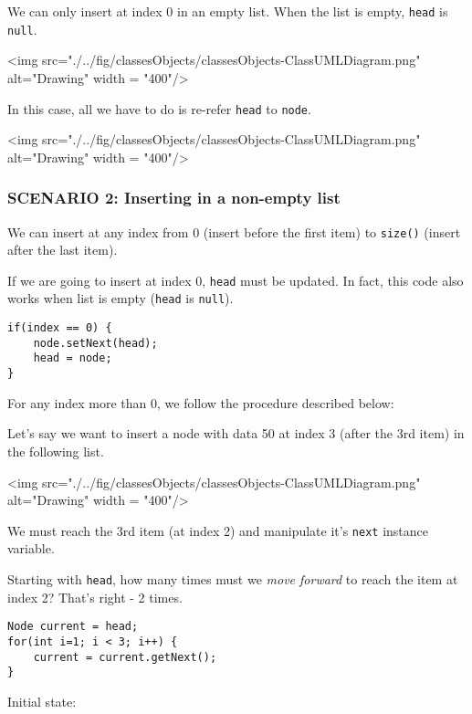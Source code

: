 We can only insert at index 0 in an empty list. When the list is empty, \texttt{head} is \texttt{null}.

\vskip 0.5cm

<img src="./../fig/classesObjects/classesObjects-ClassUMLDiagram.png" alt="Drawing" width = "400"/>

\vskip 0.5cm

In this case, all we have to do is re-refer \texttt{head} to \texttt{node}.

\vskip 0.5cm

<img src="./../fig/classesObjects/classesObjects-ClassUMLDiagram.png" alt="Drawing" width = "400"/>

\newpage

\subsubsection{SCENARIO 2: Inserting in a non-empty list}

We can insert at any index from 0 (insert before the first item) to \texttt{size()} (insert after the last item).

If we are going to insert at index 0, \texttt{head} must be updated. In fact, this code also works when list is empty (\texttt{head} is \texttt{null}).

\begin{lstlisting}
if(index == 0) {
	node.setNext(head);
	head = node;
}
\end{lstlisting}

For any index more than 0, we follow the procedure described below:

Let's say we want to insert a node with data 50 at index 3 (after the 3rd item) in the following list.

\vskip 0.5cm

<img src="./../fig/classesObjects/classesObjects-ClassUMLDiagram.png" alt="Drawing" width = "400"/>

We must reach the 3rd item (at index 2) and manipulate it's \texttt{next} instance variable.

Starting with \texttt{head}, how many times must we \emph{move forward} to reach the item at index 2? That's right - 2 times.

\begin{lstlisting}
Node current = head;
for(int i=1; i < 3; i++) {
	current = current.getNext();
}
\end{lstlisting}

Initial state:
\vskip 0.5cm

